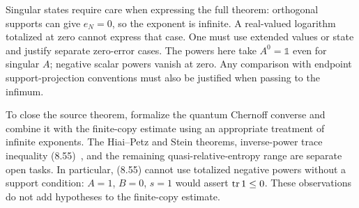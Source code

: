 \documentclass{article}
\begin{document}
Singular states require care when expressing the full theorem: orthogonal
supports can give $e_N=0$, so the exponent is infinite. A real-valued logarithm
totalized at zero cannot express that case. One must use extended values or
state and justify separate zero-error cases. The powers here take $A^0=\mathbb1$
even for singular $A$; negative scalar powers vanish at zero. Any comparison
with endpoint support-projection conventions must also be justified when
passing to the infimum.

To close the source theorem, formalize the quantum Chernoff converse and
combine it with the finite-copy estimate using an appropriate treatment of
infinite exponents. The Hiai--Petz and Stein theorems, inverse-power trace
inequality (8.55)~\cite[Equation~(8.55)]{Wolf2012Quantum}, and the remaining quasi-relative-entropy range are separate
open tasks. In particular, (8.55) cannot use totalized negative powers without
a support condition: $A=1$, $B=0$, $s=1$ would assert $\operatorname{tr}1\le0$.
These observations do not add hypotheses to the finite-copy estimate.



\end{document}
